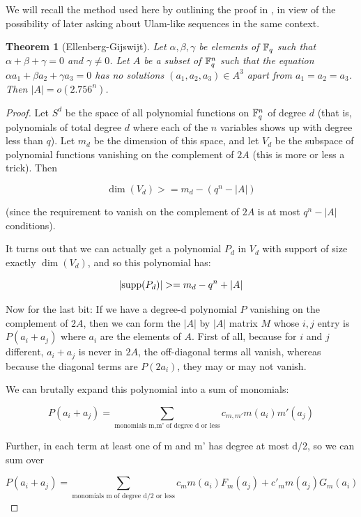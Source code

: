 \documentclass{article}
\newtheorem{theorem}{Theorem}[section]
\theoremstyle{definition}
\theoremstyle{remark}
\numberwithin{equation}{section}
\begin{document}
We will recall the method used here by outlining the proof in
\cite{capset_ellenberg}, in view of the possibility of later asking
about Ulam-like sequences in the same context.

\begin{theorem}[Ellenberg-Gijswijt]
Let $\alpha, \beta, \gamma$ be elements of $\mathbb{F}_q$ such that
$\alpha+\beta+\gamma = 0$ and $\gamma \neq 0$.  Let $A$ be a subset of
$\mathbb{F}_q^n$ such that the equation $\alpha a_1 + \beta a_2 + \gamma a_3
= 0$ has no solutions $(a_1, a_2, a_3) \in A^3$ apart from $a_1 = a_2
= a_3$.  Then $|A| = o(2.756^n)$.
\end{theorem}

\begin{proof}Let $S^d$ be the space of all polynomial functions on
  $\mathbb{F}_q^n$ of degree $d$ (that is, polynomials of total degree $d$
  where each of the $n$ variables shows up with degree less than $q$).
  Let $m_d$ be the dimension of this space, and let $V_d$ be the
  subspace of polynomial functions vanishing on the complement of $2A$
  (this is more or less a trick).  Then

  \[\dim(V_d) >= m_d - (q^n - |A|)\]
  
  (since the requirement to vanish on the complement of $2A$ is at most
  $q^n - |A|$ conditions).
  
  It turns out that we can actually get a polynomial $P_d$ in $V_d$ with
  support of size exactly $\dim(V_d)$, and so this polynomial has:
  
  \[|\text{supp}(P_d)| >= m_d - q^n + |A|\]
  
  Now for the last bit: If we have a degree-d polynomial $P$
  vanishing on the complement of $2A$, then we can form the $|A|$ by
  $|A|$ matrix $M$ whose $i,j$ entry is $P(a_i + a_j)$ where $a_i$ are
  the elements of $A$.  First of all, because for $i$ and $j$
  different, $a_i+a_j$ is never in $2A$, the off-diagonal terms all
  vanish, whereas because the diagonal terms are $P(2a_i)$, they may
  or may not vanish.
  
  
  We can brutally expand this polynomial into a sum of monomials:
  
  \[P(a_i + a_j) = \sum_{\text{monomials m,m' of degree d or less}} c_{m,m'} m(a_i) m'(a_j)\]
  
  Further, in each term at least one of m and m' has degree at most d/2, so we can sum over 
  
  \[P(a_i + a_j) = \displaystyle\sum_{\text{monomials m of degree d/2 or less}} c_{m} m(a_i) F_m(a_j) + c'_m m(a_j) G_m(a_i)\]
  

\end{proof}
\end{document}
